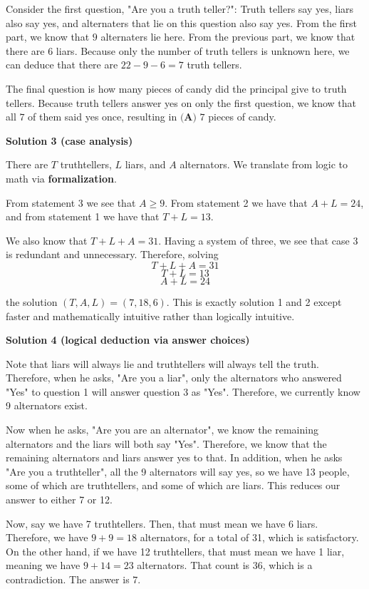 \begin{enumerate}
 Consider the first question, "Are you a truth teller?": Truth tellers say yes, liars also say yes, and alternaters that lie on this question also say yes. From the first part, we know that $9$ alternaters lie here. From the previous part, we know that there are $6$ liars. Because only the number of truth tellers is unknown here, we can deduce that there are $22-9-6=7$ truth tellers.

 The final question is how many pieces of candy did the principal give to truth tellers. Because truth tellers answer yes on only the first question, we know that all $7$ of them said yes once, resulting in $\boxed{\textbf{(A) } 7}$ pieces of candy.

 


 



\textbf{Solution 3 (case analysis)}

There are $T$ truthtellers, $L$ liars, and $A$ alternators. We translate from logic to math via \textbf{formalization}.

 From statement 3 we see that $A \ge 9$. From statement 2 we have that $A+L = 24$, and from statement 1 we have that $T+L = 13$.

 We also know that $T+L+A = 31$. Having a system of three, we see that case 3 is redundant and unnecessary. Therefore, solving
 \[T+L+A=31\]
 \[T+L=13\]
 \[A+L=24\]

 the solution $(T,A,L) = (\boxed{7},18,6)$. This is exactly solution 1 and 2 except faster and mathematically intuitive rather than logically intuitive. 

 



\textbf{Solution 4 (logical deduction via answer choices)}

Note that liars will always lie and truthtellers will always tell the truth. Therefore, when he asks, "Are you a liar", only the alternators who answered "Yes" to question 1 will answer question 3 as "Yes". Therefore, we currently know 9 alternators exist.

 Now when he asks, "Are you are an alternator", we know the remaining alternators and the liars will both say "Yes". Therefore, we know that the remaining alternators and liars answer yes to that. In addition, when he asks "Are you a truthteller", all the 9 alternators will say yes, so we have 13 people, some of which are truthtellers, and some of which are liars. This reduces our answer to either 7 or 12.

 Now, say we have 7 truthtellers. Then, that must mean we have 6 liars. Therefore, we have $9+9=18$ alternators, for a total of 31, which is satisfactory. On the other hand, if we have 12 truthtellers, that must mean we have 1 liar, meaning we have $9+14 = 23$ alternators. That count is 36, which is a contradiction. The answer is $\boxed{7}$.


\end{enumerate}
